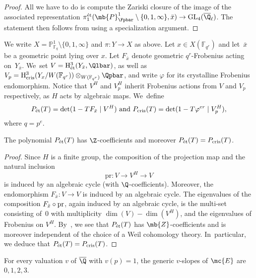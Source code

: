 \begin{proof}
All we have to do is compute the Zariski closure of the image of the associated representation $\pi_1^\textnormal{ét}(\mb{P}^1_{\Fpbar} \setminus \{0,1,\infty\},\bar x)\to\mathrm{GL}_{4}(\overline{\Q}_\ell)$. The statement then follows from \cite[Th.\,8.6]{Katz-Another-Look-at-the-Dwork-Family} using a specialization argument.
\end{proof}

We write $X=\mathbb{P}_{\mathbb{F}_q}^1\setminus\{0,1,\infty\}$ and $\pi\colon Y\to X$ as above. Let $x\in X(\mathbb{F}_{q^r})$ and let~$\bar x$ be a geometric point lying over $x$. Let $F_{\bar x}$ denote geometric $q^r$-Frobenius acting on~$Y_{\bar x}$. We~set $V=\mathrm{H}^3_\text{ét}(Y_{\bar{x}},\Qlbar)$, as well as $V_p=\mathrm{H}^3_\mathrm{cris}(Y_x/W(\mathbb{F}_{q ^r}))\otimes_{W(\mathbb{F}_{q^r})}\Qpbar$, and write $\varphi$ for its crystalline Frobenius endomorphism. Notice that $V^{H}$ and $V_p^H$ inherit Frobenius actions from $V$ and $V_p$ respectively, as $H$ acts by algebraic maps. We~define
\[
P_{\textnormal{ét}}(T)=\det(1-TF_{\bar x}\mid V^H)\text{~and~} P_{\textnormal{cris}}(T)=\det(1-T\varphi^{er}\mid V_p^H),
\]
where $q=p^e$.

\begin{lem}\label{lem: etale-slopes-and-crystalline-slopes}
The polynomial $P_{\textnormal{ét}}(T)$ has $\Z$-coefficients and moreover $P_{\textnormal{ét}}(T)=P_{\textnormal{cris}}(T)$.
\end{lem}

\begin{proof}
Since $H$ is a finite group, the composition of the projection map and the natural inclusion
\[
\mathrm{pr}\colon V\to V^H\to V
\]
is induced by an algebraic cycle (with $\Q$-coefficients). Moreover, the endomorphism $F_{\bar x}\colon V\to V$ is induced by an algebraic cycle. The eigenvalues of the composition $F_{\bar x}\circ\nobreak\mathrm{pr}$, again induced by an algebraic cycle, is the multi-set consisting of~$0$ with multiplicity $\dim(V)-\dim(V^H)$, and the eigenvalues of Frobenius on $V^H$. By~\hbox{\cite[Th.\,2(2)]{Katz-Messing-Some-Consequences-of-the-Riemann-Hypothesis-for-Varieties-over-Finite-Fields}}, we see that $P_\textnormal{ét}(T)$ has $\mb{Z}$-coefficients and is moreover independent of the choice of a Weil cohomology theory. In~particular, we deduce that $P_{\textnormal{ét}}(T)=P_{\textnormal{cris}}(T)$.
\end{proof}

\begin{lem}\label{lemma: mirror-quintic-ord}
For every valuation $v$ of $\overline{\Q}$ with $v(p)=1$, the generic $v$-slopes of $\mc{E}$ are $0,1,2,3$.
\end{lem}

